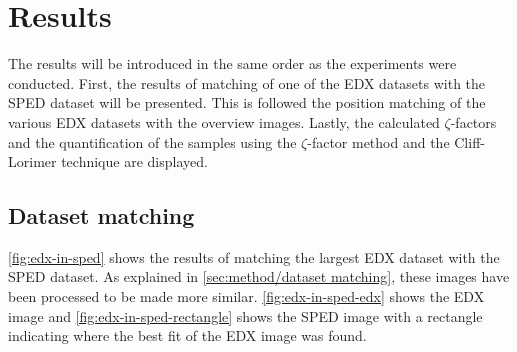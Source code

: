 \chapter{Results}

The results will be introduced in the same order as the experiments were conducted. First, the results of matching of one of the EDX datasets with the SPED dataset will be presented. This is followed the position matching of the various EDX datasets with the overview images. Lastly, the calculated $\zeta$-factors and the quantification of the samples using the $\zeta$-factor method and the Cliff-Lorimer technique are displayed.

\section{Dataset matching}

\cref{fig:edx-in-sped} shows the results of matching the largest EDX dataset with the SPED dataset. As explained in \cref{sec:method/dataset matching}, these images have been processed to be made more similar. \cref{fig:edx-in-sped-edx} shows the EDX image and \cref{fig:edx-in-sped-rectangle} shows the SPED image with a rectangle indicating where the best fit of the EDX image was found. 

